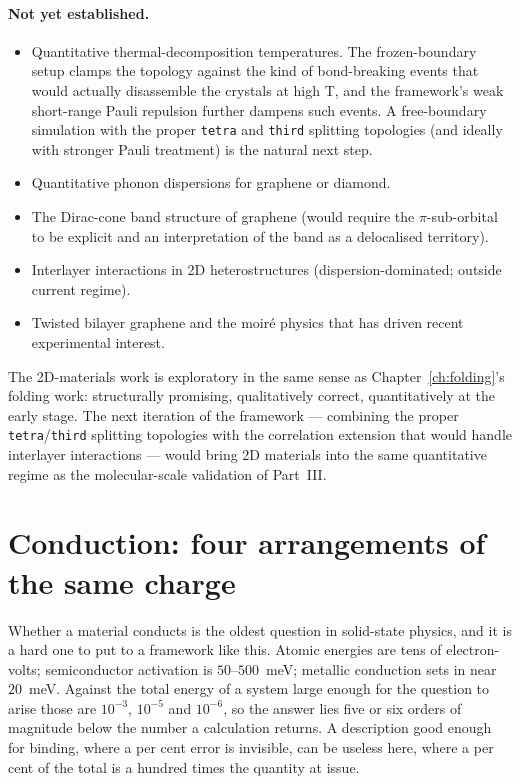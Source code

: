 \paragraph{Not yet established.}
\begin{itemize}
\item Quantitative thermal-decomposition temperatures. The frozen-boundary setup clamps the topology against the kind of bond-breaking events that would actually disassemble the crystals at high T, and the framework's weak short-range Pauli repulsion further dampens such events. A free-boundary simulation with the proper \texttt{tetra} and \texttt{third} splitting topologies (and ideally with stronger Pauli treatment) is the natural next step.
\item Quantitative phonon dispersions for graphene or diamond.
\item The Dirac-cone band structure of graphene (would require the $\pi$-sub-orbital to be explicit and an interpretation of the band as a delocalised territory).
\item Interlayer interactions in 2D heterostructures (dispersion-dominated; outside current regime).
\item Twisted bilayer graphene and the moir\'e physics that has driven recent experimental interest.
\end{itemize}

The 2D-materials work is exploratory in the same sense as Chapter~\ref{ch:folding}'s folding work: structurally promising, qualitatively correct, quantitatively at the early stage. The next iteration of the framework --- combining the proper \texttt{tetra}/\texttt{third} splitting topologies with the correlation extension that would handle interlayer interactions --- would bring 2D materials into the same quantitative regime as the molecular-scale validation of Part~III.

\section{Conduction: four arrangements of the same charge}\label{sec:conduction}

Whether a material conducts is the oldest question in solid-state physics, and it is a hard one to
put to a framework like this. Atomic energies are tens of electron-volts; semiconductor activation
is $50$--$500$~meV; metallic conduction sets in near $20$~meV. Against the total energy of a system
large enough for the question to arise those are $10^{-3}$, $10^{-5}$ and $10^{-6}$, so the answer
lies five or six orders of magnitude below the number a calculation returns. A description good
enough for binding, where a per cent error is invisible, can be useless here, where a per cent of
the total is a hundred times the quantity at issue.

